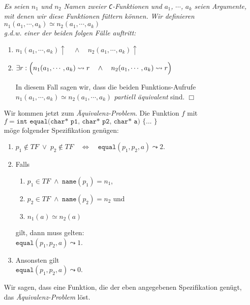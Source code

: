 \begin{Definition}[$\simeq$] 
{\em 
Es seien $n_1$ und $n_2$ Namen zweier \texttt{C}-Funktionen und
  $a_1$, $\cdots$, $a_k$ seien Argumente, mit denen wir diese Funktionen f\"uttern k\"onnen. Wir definieren \\[0.1cm]
\hspace*{1.3cm} $n_1(a_1,\cdots,a_k) \simeq n_2(a_1,\cdots,a_k)$ \\[0.1cm]
g.d.w. einer der beiden folgen F\"alle auftritt:
\begin{enumerate}
\item $n_1(a_1,\cdots,a_k)\uparrow \quad\wedge\quad n_2(a_1,\cdots,a_k)\uparrow$
\item $\exists r: \Bigl(n_1(a_1,\cdots,a_k) \leadsto r \quad\wedge\quad n_2(a_1,\cdots,a_k) \leadsto r\Bigr)$

      In diesem Fall sagen wir, dass die beiden Funktions-Aufrufe 
      $n_1(a_1,\cdots,a_k) \simeq n_2(a_1,\cdots,a_k)$ \emph{partiell \"aquivalent} sind.
      \hspace*{\fill} $\Box$
\end{enumerate}}
\end{Definition}

\noindent
Wir kommen jetzt zum \emph{\"Aquivalenz-Problem}.  Die Funktion $f$ mit
\\[0.2cm]
\hspace*{1.3cm}
$f = \texttt{int equal(char* p1, char* p2, char* a) \{ ... \}}$
\\[0.2cm]
m\"oge folgender Spezifikation gen\"ugen:
\begin{enumerate}
\item $p_1 \not\in T\!F \;\vee\; p_2 \not\in T\!F \quad\Leftrightarrow\quad \mathtt{equal}(p_1, p_2, a) \leadsto 2$.
\item Falls 
  \begin{enumerate}
  \item $p_1 \in T\!F \;\wedge\; \mathtt{name}(p_1) = n_1$,
  \item $p_2 \in T\!F \;\wedge\; \mathtt{name}(p_2) = n_2$ \quad und
  \item $n_1(a) \simeq n_2(a)$
  \end{enumerate}
    gilt, dann muss gelten: \\[0.1cm]
   \hspace*{1.3cm}  $\mathtt{equal}(p_1, p_2, a) \leadsto 1$.
\item Ansonsten gilt \\[0.1cm]
      \hspace*{1.3cm} $\mathtt{equal}(p_1, p_2, a) \leadsto 0$.
\end{enumerate}
Wir sagen, dass eine Funktion, die der eben angegebenen Spezifikation gen\"ugt, das
\emph{\"Aquivalenz-Problem} l\"ost.

